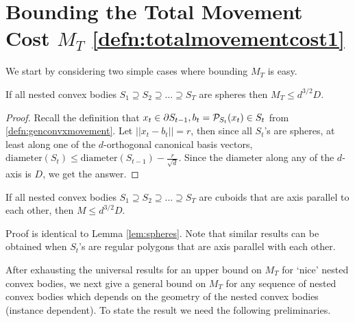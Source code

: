 \section{Bounding the Total Movement Cost $M_T$ \eqref{defn:totalmovementcost1}}




We start by considering two simple cases where bounding $M_T$ is easy.
 \begin{lemma}\label{lem:spheres}
If all nested convex bodies $S_1\supseteq S_2  \supseteq \dots \supseteq S_T$ are spheres then $M_T\le d^{3/2}D$.
\end{lemma}

\begin{proof}
Recall the definition that $x_t\in \partial S_{t-1}, b_t=\mathcal{P}_{S_{t}}(x_t)\in S_t$ from \eqref{defn:genconvxmovement}.
Let $||x_t-b_t||=r$, then since all $S_t$'s are spheres, at least along one of the $d$-orthogonal canonical basis vectors, $\text{diameter}(S_{t})\le \text{diameter}(S_{t-1}) - \frac{r}{\sqrt{d}}$. Since the diameter along any of the $d$-axis is $D$, we get the answer.
\end{proof}

 \begin{lemma}\label{lem:square}
If all nested convex bodies $S_1\supseteq S_2  \supseteq \dots \supseteq S_T$ are cuboids that are axis parallel to each other, then $M\le d^{3/2}D$.
\end{lemma}
Proof is identical to Lemma \ref{lem:spheres}.
Note that similar results can be obtained when $S_t$'s are regular polygons that are axis parallel with each other.


 
 After exhausting the universal results for an upper bound on $M_T$ for `nice' nested convex bodies, we next give a general bound on $M_T$ for any sequence of nested convex bodies which depends on the geometry of the nested convex bodies (instance dependent).
 To state the result we need the following preliminaries.
 
